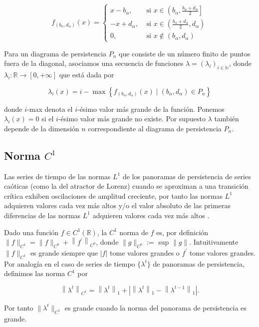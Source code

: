 \[
f_{\left(b_{\alpha}, d_{\alpha}\right)}(x)= \begin{cases}x-b_{\alpha}, & \text { si } x \in\left(b_{\alpha}, \frac{b_{\alpha}+d_{\alpha}}{2}\right] \\ -x+d_{\alpha}, & \text { si } x \in\left(\frac{b_{\alpha}+d_{\alpha}}{2}, d_{\alpha}\right) \\ 0, & \text { si } x \notin\left(b_{\alpha}, d_{\alpha}\right)\end{cases}
\] 

Para un diagrama de persistencia $P_n$ que consiste de un número finito de puntos fuera de la diagonal, asociamos una secuencia de funciones $\lambda = (\lambda_i)_{i\in \mathbb{N}}$, donde $\lambda_i : \mathbb{R} \to [0,+\infty]$ que está dada por 

\[
\lambda_{i}(x)=i-\max \left\{f_{\left(b_{\alpha}, d_{\alpha}\right)}(x) \mid\left(b_{\alpha}, d_{\alpha}\right) \in P_{n}\right\}
\]

donde $i$-max denota el $i$-ésimo valor más grande de la función. Ponemos $\lambda_i (x) = 0$ si el $i$-ésimo valor más grande no existe. Por supuesto $\lambda$ también depende de la dimensión $n$ correspondiente al diagrama de persistencia $P_n$. 


\subsection{Norma $C^1$}

Las series de tiempo de las normas $L^1$ de los panoramas de persistencia de series caóticas (como la del atractor de Lorenz) cuando se aproximan a una transición crítica  exhiben oscilaciones de amplitud creciente, por tanto las normas $L^1$ adquieren valores cada vez más altos y/o el valor absoluto de las primeras diferencias de las normas $L^1$ adquieren valores cada vez más altos \cite{gideaTopologicalRecognitionCritical2020}.

Dado una función $f \in C^1(\mathbb{R})$, la $C^1$ norma de $f$ es, por definición $\|f\|_{C^{1}}=\|f\|_{C^{0}}+\left\|f^{\prime}\right\|_{C^{0}}$, donde $\|g\|_{C^0} :=$ sup $\|g\|$. Intuitivamente $\|f\|_{C^{1}}$ es grande siempre que $|f|$ tome valores grandes o $f^{\prime}$ tome valores grandes. Por analogía en el caso de series de tiempo $\{\lambda^t \}$ de panoramas de persistencia, definimos las norma $C^1$ por 

\[
\left\|\lambda^{t}\right\|_{C^{1}}=\left\|\lambda^{t}\right\|_{1}+\left|\left\|\lambda^{t}\right\|_{1}-\left\|\lambda^{t-1}\right\|_{1}\right|.
\]

Por tanto $\|\lambda^t\|_{C^1}$ es grande cuando la norma del panorama de persistencia es grande.

























